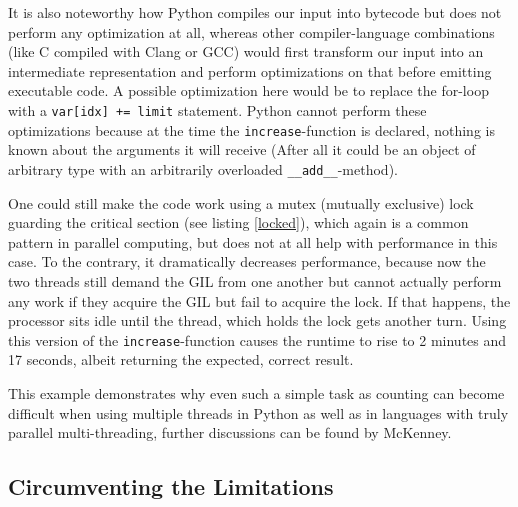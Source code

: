 \documentclass[english,11pt,a4paper,table]{article} %
\begin{document}
It is also noteworthy how Python compiles our input into bytecode but does not perform any optimization at all,
whereas other compiler-language combinations (like C compiled with Clang or GCC) would first transform our input into an intermediate representation and perform optimizations on that before emitting executable code.
A possible optimization here would be to replace the for-loop with a \texttt{var[idx] += limit} statement.
Python cannot perform these optimizations because at the time the \texttt{increase}-function is declared, nothing is known about the arguments it will receive (After all it could be an object of arbitrary type with an arbitrarily overloaded \texttt{\_\_add\_\_}-method).

One could still make the code work using a mutex (mutually exclusive) lock guarding the critical section (see listing \ref{locked}),
which again is a common pattern in parallel computing, but does not at all help with performance in this case.
To the contrary, it dramatically decreases performance, because now the two threads still demand the GIL from one another but cannot actually perform any work if they acquire the GIL but fail to acquire the lock.
If that happens, the processor sits idle until the thread, which holds the lock gets another turn.
Using this version of the \texttt{increase}-function causes the runtime to rise to 2 minutes and 17 seconds, albeit returning the expected, correct result.


This example demonstrates why even such a simple task as counting can become difficult when using multiple threads in Python as well as in languages with truly parallel multi-threading, further discussions can be found by McKenney. \cite[Chapter 5]{mckenney2009parallel}


\subsection{Circumventing the Limitations}
\end{document}
